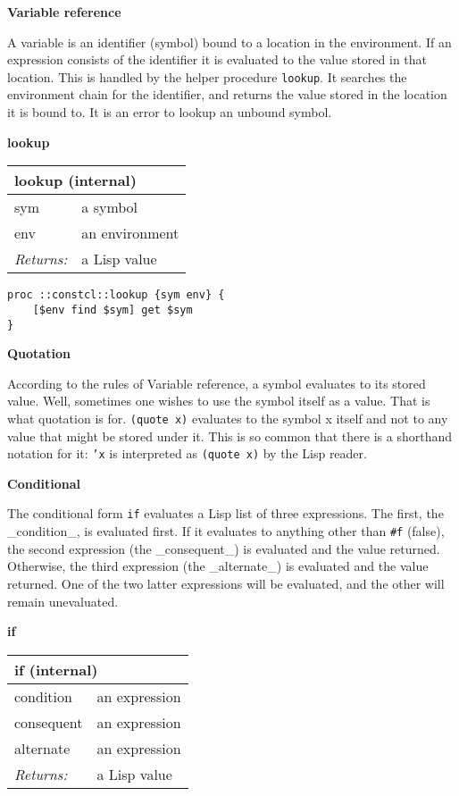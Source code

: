 \documentclass{report}
\begin{document}
\textbf{Variable reference}


A variable is an identifier (symbol) bound to a location in the environment. If an expression consists of the identifier it is evaluated to the value stored in that location. This is handled by the helper procedure \texttt{lookup}. It searches the environment chain for the identifier, and returns the value stored in the location it is bound to. It is an error to lookup an unbound symbol.


\textbf{lookup}

\begin{tabular}{ |l l| }
\hline
\multicolumn{2}{|l|}{lookup (internal)} \\
\hline
sym & a symbol \\
env & an environment \\
\textit{Returns:} & a Lisp value \\
\hline
\end{tabular}

\noindent\makebox[\linewidth]{\rule{\linewidth}{0.4pt}}
\begin{lstlisting}
proc ::constcl::lookup {sym env} {
    [$env find $sym] get $sym
}
\end{lstlisting}
\noindent\makebox[\linewidth]{\rule{\linewidth}{0.4pt}}

\textbf{Quotation}


According to the rules of Variable reference, a symbol evaluates to its stored value. Well, sometimes one wishes to use the symbol itself as a value. That is what quotation is for. \texttt{(quote x)} evaluates to the symbol x itself and not to any value that might be stored under it. This is so common that there is a shorthand notation for it: \texttt{'x} is interpreted as \texttt{(quote x)} by the Lisp reader.


\textbf{Conditional}


The conditional form \texttt{if} evaluates a Lisp list of three expressions. The first, the \_condition\_, is evaluated first. If it evaluates to anything other than \texttt{\#f} (false), the second expression (the \_consequent\_) is evaluated and the value returned. Otherwise, the third expression (the \_alternate\_) is evaluated and the value returned. One of the two latter expressions will be evaluated, and the other will remain unevaluated.


\textbf{if}

\begin{tabular}{ |l l| }
\hline
\multicolumn{2}{|l|}{if (internal)} \\
\hline
condition & an expression \\
consequent & an expression \\
alternate & an expression \\
\textit{Returns:} & a Lisp value \\
\hline
\end{tabular}
\end{document}
